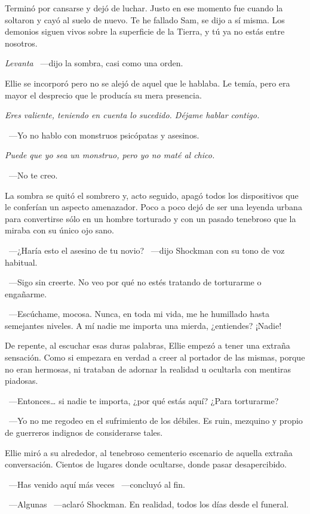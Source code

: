 Terminó por cansarse y dejó de luchar. Justo en ese momento fue cuando la soltaron y cayó al suelo de nuevo. Te he fallado Sam, se dijo a sí misma. Los demonios siguen vivos sobre la superficie de la Tierra, y tú ya no estás entre nosotros.

\emph{Levanta} ~---dijo la sombra, casi como una orden.

Ellie se incorporó pero no se alejó de aquel que le hablaba. Le temía, pero era mayor el desprecio que le producía su mera presencia.

\emph{Eres valiente, teniendo en cuenta lo sucedido. Déjame hablar contigo.}

~---Yo no hablo con monstruos psicópatas y asesinos.

\emph{Puede que yo sea un monstruo, pero yo no maté al chico.}

~---No te creo.

La sombra se quitó el sombrero y, acto seguido, apagó todos los dispositivos que le conferían un aspecto amenazador. Poco a poco dejó de ser una leyenda urbana para convertirse sólo en un hombre torturado y con un pasado tenebroso que la miraba con su único ojo sano.

~---¿Haría esto el asesino de tu novio? ~---dijo Shockman con su tono de voz habitual.

~---Sigo sin creerte. No veo por qué no estés tratando de torturarme o engañarme.

~---Escúchame, mocosa. Nunca, en toda mi vida, me he humillado hasta semejantes niveles. A mí nadie me importa una mierda, ¿entiendes? ¡Nadie!

De repente, al escuchar esas duras palabras, Ellie empezó a tener una extraña sensación. Como si empezara en verdad a creer al portador de las mismas, porque no eran hermosas, ni trataban de adornar la realidad u ocultarla con mentiras piadosas.

~---Entonces… si nadie te importa, ¿por qué estás aquí? ¿Para torturarme?

~---Yo no me regodeo en el sufrimiento de los débiles. Es ruin, mezquino y propio de guerreros indignos de considerarse tales.

Ellie miró a su alrededor, al tenebroso cementerio escenario de aquella extraña conversación. Cientos de lugares donde ocultarse, donde pasar desapercibido.

~---Has venido aquí más veces ~---concluyó al fin.

~---Algunas ~---aclaró Shockman. En realidad, todos los días desde el funeral.

